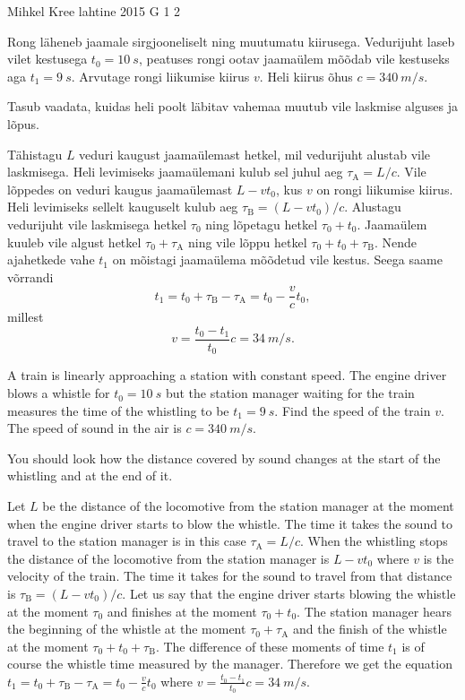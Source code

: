 {Mihkel Kree} %
{lahtine} %
{2015} %
{G 1} %
{2} %
{
\ifStatement
Rong läheneb jaamale sirgjooneliselt ning muutumatu kiirusega. Vedurijuht laseb vilet kestusega $t_0=\SI{10}{s}$, peatuses rongi ootav jaamaülem mõõdab vile kestuseks aga $t_1=\SI{9}{s}$. Arvutage rongi liikumise kiirus $v$. Heli kiirus õhus $c=\SI{340}{m/s}$.
\fi


\ifHint
Tasub vaadata, kuidas heli poolt läbitav vahemaa muutub vile laskmise alguses ja lõpus.
\fi


\ifSolution
Tähistagu $L$ veduri kaugust jaamaülemast hetkel, mil vedurijuht alustab vile laskmisega. Heli levimiseks jaamaülemani kulub sel juhul aeg $\tau_\text{A}=L/c$. Vile lõppedes on veduri kaugus jaamaülemast $L-vt_0$, kus $v$ on rongi liikumise kiirus. Heli levimiseks sellelt kauguselt kulub aeg $\tau_\text{B}=(L-vt_0)/c$. Alustagu vedurijuht vile laskmisega hetkel $\tau_0$ ning lõpetagu hetkel $\tau_0+t_0$. Jaamaülem kuuleb vile algust hetkel $\tau_0+\tau_\text{A}$ ning vile lõppu hetkel $\tau_0+t_0+\tau_\text{B}$. Nende ajahetkede vahe $t_1$ on mõistagi jaamaülema mõõdetud vile kestus. Seega saame võrrandi
\[
t_1 = t_0+\tau_\text{B}-\tau_\text{A} = t_0 - \frac{v}{c}t_0,
\]
millest
\[
v = \frac{t_0-t_1}{t_0}c = \SI{34}{m/s}.
\]
\fi


\ifEngStatement
A train is linearly approaching a station with constant speed. The engine driver blows a whistle for $t_0=\SI{10}{s}$ but the station manager waiting for the train measures the time of the whistling to be $t_1=\SI{9}{s}$. Find the speed of the train $v$. The speed of sound in the air is $c=\SI{340}{m/s}$.
\fi


\ifEngHint
You should look how the distance covered by sound changes at the start of the whistling and at the end of it.
\fi


\ifEngSolution
Let $L$ be the distance of the locomotive from the station manager at the moment when the engine driver starts to blow the whistle. The time it takes the sound to travel to the station manager is in this case $\tau_\text{A}=L/c$. When the whistling stops the distance of the locomotive from the station manager is $L-vt_0$ where $v$ is the velocity of the train. The time it takes for the sound to travel from that distance is $\tau_\text{B}=(L-vt_0)/c$. Let us say that the engine driver starts blowing the whistle at the moment $\tau_0$ and finishes at the moment $\tau_0+t_0$. The station manager hears the beginning of the whistle at the moment $\tau_0+\tau_\text{A}$ and the finish of the whistle at the moment $\tau_0+t_0+\tau_\text{B}$. The difference of these moments of time $t_1$ is of course the whistle time measured by the manager. Therefore we get the equation $t_1 = t_0+\tau_\text{B}-\tau_\text{A} = t_0 - \frac{v}{c}t_0$ where $v = \frac{t_0-t_1}{t_0}c = \SI{34}{m/s}$.
\fi
}